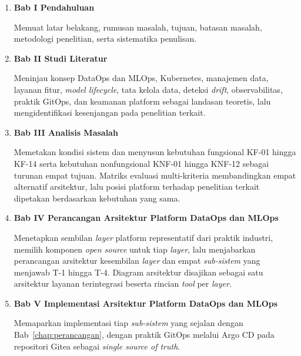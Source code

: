 \vspace{0.5em}
\begin{enumerate}
    \item \textbf{Bab I Pendahuluan}

    Memuat latar belakang, rumusan masalah, tujuan, batasan masalah, metodologi penelitian, serta sistematika penulisan.

    \vspace{0.5em}

    \item \textbf{Bab II Studi Literatur}

    Meninjau konsep DataOps dan MLOps, Kubernetes, manajemen data, layanan fitur, \textit{model lifecycle}, tata kelola data, deteksi \textit{drift}, observabilitas, praktik GitOps, dan keamanan platform sebagai landasan teoretis, lalu mengidentifikasi kesenjangan pada penelitian terkait.

    \vspace{0.5em}

    \item \textbf{Bab III Analisis Masalah}

    Memetakan kondisi sistem dan menyusun kebutuhan fungsional KF-01 hingga KF-14 serta kebutuhan nonfungsional KNF-01 hingga KNF-12 sebagai turunan empat tujuan. Matriks evaluasi multi-kriteria membandingkan empat alternatif arsitektur, lalu posisi platform terhadap penelitian terkait dipetakan berdasarkan kebutuhan yang sama.

    \vspace{0.5em}

    \item \textbf{Bab IV Perancangan Arsitektur Platform DataOps dan MLOps}

    Menetapkan sembilan \textit{layer} platform representatif dari praktik industri, memilih komponen \textit{open source} untuk tiap \textit{layer}, lalu menjabarkan perancangan arsitektur kesembilan \textit{layer} dan empat \textit{sub-sistem} yang menjawab T-1 hingga T-4. Diagram arsitektur disajikan sebagai satu arsitektur layanan terintegrasi beserta rincian \textit{tool} per \textit{layer}.

    \vspace{0.5em}

    \item \textbf{Bab V Implementasi Arsitektur Platform DataOps dan MLOps}

    Memaparkan implementasi tiap \textit{sub-sistem} yang sejalan dengan Bab~\ref{chap:perancangan}, dengan praktik GitOps melalui Argo CD pada repositori Gitea sebagai \textit{single source of truth}.


\end{enumerate}
